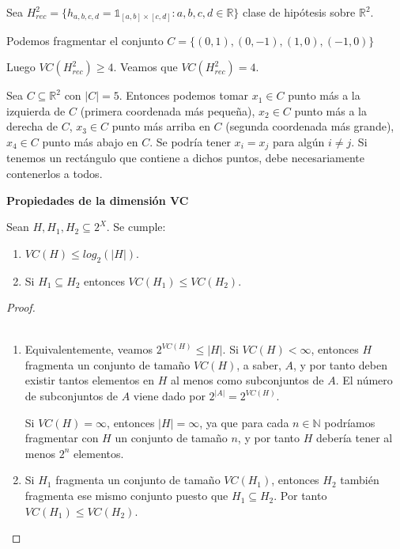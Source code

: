 \begin{example}

Sea $H^2_{rec} = \{h_{a,b,c,d} = \mathds{1}_{[a,b]\times [c,d]}: a,b,c,d\in \mathbb{R}\}$ clase de hipótesis sobre 
$\mathbb{R}^2$.

Podemos fragmentar el conjunto $C = \{(0,1), (0,-1), (1,0), (-1,0)\}$


Luego $VC(H^2_{rec}) \ge 4$. Veamos que $VC(H^2_{rec}) = 4$.

Sea $C\subseteq \mathbb{R}^2$ con $|C|=5$. Entonces podemos 
tomar $x_1 \in C$ punto más a la izquierda de $C$ (primera coordenada más pequeña), $x_2 \in C$ punto más a la derecha de 
$C$, $x_3 \in C$ punto más arriba en $C$ (segunda coordenada más grande), $x_4 \in C$ punto más abajo en $C$. Se podría 
tener $x_i = x_j$ para algún $i\neq j$. Si tenemos un rectángulo que contiene a dichos puntos, debe necesariamente contenerlos
a todos.
\end{example}



\begin{fact} \textbf{Propiedades de la dimensión VC}

Sean $H,H_1, H_2 \subseteq 2^X$. Se cumple:

\begin{enumerate}[i]
 \item $VC(H) \le log_2(|H|)$.
 \item Si $H_1 \subseteq H_2$ entonces $VC(H_1) \le VC(H_2)$.
\end{enumerate}
\end{fact}

\begin{proof} \\~
 \begin{enumerate}[i]
  \item Equivalentemente, veamos $2^{VC(H)} \le |H|$. Si $VC(H) < \infty$, entonces $H$ fragmenta un conjunto de tamaño
  $VC(H)$, a saber, $A$, y por tanto deben existir tantos elementos en $H$ al menos como subconjuntos de $A$. El número de
  subconjuntos de $A$ viene dado por $2^{|A|} = 2^{VC(H)}$. 
  
  Si $VC(H) = \infty$, entonces $|H| = \infty$, ya que para cada 
  $n\in \mathbb{N}$ podríamos fragmentar con $H$ un conjunto de tamaño $n$, y por tanto $H$ debería tener al menos $2^n$ 
  elementos.
  \item Si $H_1$ fragmenta un conjunto de tamaño $VC(H_1)$, entonces $H_2$ también fragmenta ese mismo conjunto puesto que
  $H_1 \subseteq H_2$. Por tanto $VC(H_1) \le VC(H_2)$.
 \end{enumerate}
\end{proof}


